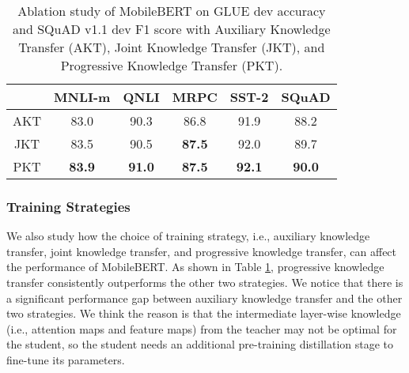 \documentclass[11pt,a4paper]{article}
\begin{document}
\setlength{\tabcolsep}{3pt}
\begin{table}[t]





\begin{center}
	    \small
		\begin{tabular}{c | c c c c c}
			\hline
             & \textbf{MNLI-m} & \textbf{QNLI} & \textbf{MRPC} & \textbf{SST-2} & \textbf{SQuAD}\\
             \hline
			 AKT & 83.0 & 90.3 & 86.8 & 91.9 & 88.2\\
			 JKT & 83.5 & 90.5 & \textbf{87.5} & 92.0 & 89.7\\
			 PKT & \textbf{83.9} & \textbf{91.0} &\textbf{87.5} & \textbf{92.1} & \textbf{90.0}\\
			\hline
		\end{tabular}
	\end{center}
\caption{Ablation study of MobileBERT on GLUE dev accuracy and SQuAD v1.1 dev F1 score with Auxiliary Knowledge Transfer (AKT), Joint Knowledge Transfer (JKT), and Progressive Knowledge Transfer (PKT).}
\label{tab:strategy}
\end{table}

\setlength{\tabcolsep}{6pt}


\subsubsection{Training Strategies}

We also study how the choice of training strategy, i.e., auxiliary knowledge transfer, joint knowledge transfer, and progressive knowledge transfer, can affect the performance of MobileBERT. As shown in Table \ref{tab:strategy}, progressive knowledge transfer consistently outperforms the other two strategies. We notice that there is a significant performance gap between auxiliary knowledge transfer and the other two strategies. We think the reason is that the intermediate layer-wise knowledge (i.e., attention maps and feature maps) from the teacher may not be optimal for the student, so the student needs an additional pre-training distillation stage to fine-tune its parameters.
\end{document}
